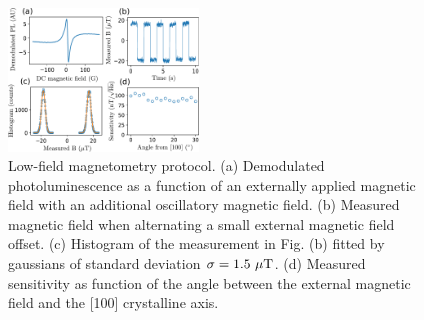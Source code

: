 \documentclass[preprintnumbers,amsmath,amssymb,superscriptaddress,twocolumn,showpacs]{revtex4-2}
\begin{document}
%
%
%
%

\begin{figure}
\includegraphics[width=0.45\textwidth]{Figures/fig_magneto}
\caption{Low-field magnetometry protocol. (a) Demodulated photoluminescence as a function of an externally applied magnetic field with an additional oscillatory magnetic field. (b) Measured magnetic field when alternating a small external magnetic field offset. (c) Histogram of the measurement in Fig. (b) fitted by gaussians of standard deviation $\sigma=1.5\ \mu \rm T$. (d) Measured sensitivity as function of the angle between the external magnetic field and the [100] crystalline axis.}
\label{magneto}
\end{figure}
%
\end{document}
